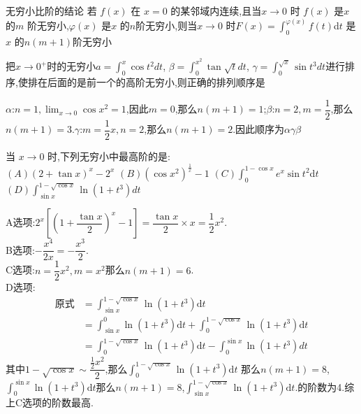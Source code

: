\documentclass[8pt a4paper, oneside, UTF8]{ctexbook}
\begin{document}
\begin{sloppypar}
    \begin{conclusion}{无穷小比阶的结论}{}
        若 $f(x)$ 在 $x=0$ 的某邻域内连续,且当$x\to0$ 时 $f(x)$ 是$x$的$m$ 阶无穷小,$\varphi(x)$ 是$x$ 的$n$阶无穷小,则当$x\to0$ 时$F( x) = \int _0^{\varphi(x)}f(t)$d$t$ 是$x$ 的$n(m+1)$阶无穷小
    \end{conclusion}
    \begin{problem}
    把$x\to 0^+$时的无穷小$a= \int _0^x \cos t^2dt$, $\beta= \int _0^{x^2} \tan\sqrt{t} dt$, $\gamma= \int _0^{\sqrt{x}} \sin t^3 dt$进行排序,使排在后面的是前一个的高阶无穷小,则正确的排列顺序是
    \end{problem}
    \begin{solution}
        $\alpha$:$n=1,\lim_{x\to 0} \cos x^2=1$,因此$m=0$,那么$n(m+1)=1$;$\beta$:$n=2,m=\dfrac{1}{2}$,那么$n(m+1)=3$.$\gamma$:$m=\dfrac{1}{2}x,n=2$,那么$n(m+1)=2$.因此顺序为$\alpha \gamma \beta$
    \end{solution}
    \begin{problem}
    当 $x\to0$ 时,下列无穷小中最高阶的是:\\
    $\left(A\right)\left(2+\tan x\right)^{x}-2^{x}$ \qquad $\left(B\right)\left(\cos x^{2}\right)^{\frac{1}{x}}-1$ \qquad $( C) \int _0^{1- \cos x}e^{x}\sin t^2$d$t$ \qquad$\left(D\right)\int_{\sin x}^{1-\sqrt{\cos x}}\ln(1+t^{3})dt$
    \end{problem}
    \begin{solution}
        A选项:$2^x[(1+\dfrac{\tan x}{2})^x-1]=\dfrac{\tan x}{2}\times x=\dfrac{1}{2}x^2$.\\
        B选项:$-\dfrac{x^4}{2x}=-\dfrac{x^3}{2}$.\\
        C选项:$n=\dfrac{1}{2}x^2,m=x^2$那么$n(m+1)=6$.\\
        D选项:\begin{align*}
            \text{原式} & = \int_{\sin x}^{1-\sqrt{\cos x}}\ln(1+t^3) \mathrm{d}t                                \\
                      & = \int_{\sin x}^0\ln(1+t^3) \mathrm{d}t+\int_0^{1-\sqrt{\cos x}}\ln(1+t^3) \mathrm{d}t \\
                      & = \int_{0}^{1-\sqrt{\cos x}}\ln(1+t^{3})\mathrm{d}t-\int_{0}^{\sin x}\ln(1+t^{3})dt
        \end{align*}
        其中$1-\sqrt{\cos x}\sim\dfrac{\frac12x^2}2$,那么$\int_0^{1-\sqrt{\cos x}}\ln(1+t^3) \mathrm{d}t$
        那么$n(m+1)=8$,$\int_0^{\sin x}\ln\left(1+t^3\right)\mathrm{d}t$那么$n(m+1)=8$,$\int_{\sin x}^{1-\sqrt{\cos x}}\ln(1+t^3) \mathrm{d}t.$的阶数为4.综上C选项的阶数最高.

\end{solution}
\end{sloppypar}
\end{document}
